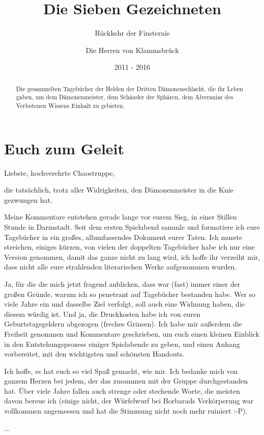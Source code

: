 \documentclass[11pt]{scrreprt}
\title{Die Sieben Gezeichneten}
\subtitle{Rückkehr der Finsternis}
\author{Die Herren von Klammsbrück}
\date{2011 - 2016}
\begin{document}
\maketitle

\begin{abstract}
Die gesammelten Tagebücher der Helden der Dritten Dämonenschlacht, die ihr Leben gaben, um dem Dämonenmeister, dem Schänder der Sphären, dem Alveraniar des Verbotenen Wissens Einhalt zu gebieten.
\end{abstract}

\chapter{Euch zum Geleit}
Liebste, hochverehrte Chaostruppe, 

die tatsächlich, trotz aller Widrigkeiten, den Dämonenmeister in die Knie gezwungen hat.\par\medskip

Meine Kommentare entstehen gerade lange vor eurem Sieg, in einer Stillen Stunde in Darmstadt. Seit dem ersten Spielabend sammle und formatiere ich eure Tagebücher in ein großes, allumfassendes Dokument eurer Taten. Ich musste streichen, einiges kürzen, von vielen der doppelten Tagebücher habe ich nur eine Version genommen, damit das ganze nicht zu lang wird, ich hoffe ihr verzeiht mir, dass nicht alle eure strahlenden literarischen Werke aufgenommen wurden.\par\medskip

Ja, für die die mich jetzt fragend anblicken, dass war (fast) immer einer der großen Gründe, warum ich so penetrant auf Tagebücher bestanden habe. Wer so viele Jahre ein und dasselbe Ziel verfolgt, soll auch eine Widmung haben, die diesem würdig ist. Und ja, die Druckkosten habe ich von euren Geburtstagsgeldern abgezogen (freches Grinsen). Ich habe mir außerdem die Freiheit genommen und Kommentare geschrieben, um euch einen kleinen Einblick in den Entstehungsprozess einiger Spielabende zu geben, und einen Anhang vorbereitet, mit den wichtigsten und schönsten Handouts.\par\medskip

Ich hoffe, es hat euch so viel Spaß gemacht, wie mir. Ich bedanke mich von ganzem Herzen bei jedem, der das zusammen mit der Gruppe durchgestanden hat. Über viele Jahre fallen auch strenge oder stechende Worte, die meisten davon bereue ich (einige nicht, der Würfelwurf bei Borbarads Verkörperung war vollkommen angemessen und hat die Stimmung nicht noch mehr ruiniert :-P).\par\medskip
...
\end{document}
